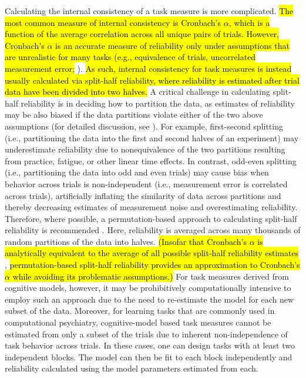 \documentclass[a4paper,12pt]{article}
\begin{document}
Calculating the internal consistency of a task measure is more complicated. \hl{The most common measure of internal consistency is Cronbach's $\alpha$, which is a function of the average correlation across all unique pairs of trials. However, Cronbach's $\alpha$ is an accurate measure of reliability only under assumptions that are unrealistic for many tasks (e.g., equivalence of trials, uncorrelated measurement error;} \cite{Green2016-xw, Parsons2019-jw}). \hl{As such, internal consistency for task measures is instead usually calculated via split-half reliability, where reliability is estimated after trial data have been divided into two halves.} A critical challenge in calculating split-half reliability is in deciding how to partition the data, as estimates of reliability may be also biased if the data partitions violate either of the two above assumptions (for detailed discussion, see \cite{Green2016-xw, Pronk2022-mq}). For example, first-second splitting (i.e., partitioning the data into the first and second halves of an experiment) may underestimate reliability due to nonequivalence of the two partitions resulting from practice, fatigue, or other linear time effects. In contrast, odd-even splitting (i.e., partitioning the data into odd and even trials) may cause bias when behavior across trials is non-independent (i.e., measurement error is correlated across trials),  artificially inflating the similarity of data across partitions and thereby decreasing estimates of measurement noise and overestimating reliability. Therefore, where possible, a permutation-based approach to calculating split-half reliability is recommended \cite{Pronk2022-mq, Parsons2019-jw}. Here, reliability is averaged across many thousands of random partitions of the data into halves. \hl{(Insofar that Cronbach's $\alpha$ is analytically equivalent to the average of all possible split-half reliability estimates} \cite{cronbach1951coefficient}, \hl{permutation-based split-half reliability provides an approximation to Cronbach's $\alpha$ while avoiding its problematic assumptions.)} For task measures derived from cognitive models, however, it may be prohibitively computationally intensive to employ such an approach due to the need to re-estimate the model for each new subset of the data. Moreover, for learning tasks that are commonly used in computational psychiatry, cognitive-model based task measures cannot be estimated from only a subset of the trials due to inherent non-independence of task behavior across trials. In these cases, one can design tasks with at least two independent blocks. The model can then be fit to each block independently and reliability calculated using the model parameters estimated from each. 
\end{document}
